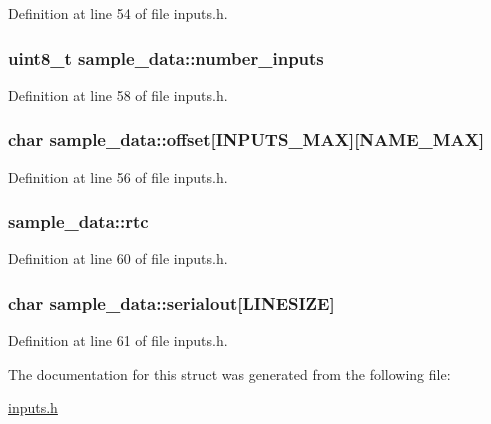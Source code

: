 Definition at line 54 of file inputs.\-h.

\hypertarget{structsample__data_aab5f5b842f431253c223d01ba22fef55}{
\subsubsection[{number\-\_\-inputs}]{\setlength{\rightskip}{0pt plus 5cm}uint8\-\_\-t sample\-\_\-data\-::number\-\_\-inputs}}\label{structsample__data_aab5f5b842f431253c223d01ba22fef55}


Definition at line 58 of file inputs.\-h.

\hypertarget{structsample__data_a4c30d8a850f9c106f5614849386d498e}{
\subsubsection[{offset}]{\setlength{\rightskip}{0pt plus 5cm}char sample\-\_\-data\-::offset\mbox{[}{\bf I\-N\-P\-U\-T\-S\-\_\-\-M\-A\-X}\mbox{]}\mbox{[}{\bf N\-A\-M\-E\-\_\-\-M\-A\-X}\mbox{]}}}\label{structsample__data_a4c30d8a850f9c106f5614849386d498e}


Definition at line 56 of file inputs.\-h.

\hypertarget{structsample__data_abc7bac4a5c01e9effcf9f33a42f57f06}{
\subsubsection[{rtc}]{ sample\-\_\-data\-::rtc}}\label{structsample__data_abc7bac4a5c01e9effcf9f33a42f57f06}


Definition at line 60 of file inputs.\-h.

\hypertarget{structsample__data_af18460f06968c075db59516a21c409a7}{
\subsubsection[{serialout}]{\setlength{\rightskip}{0pt plus 5cm}char sample\-\_\-data\-::serialout\mbox{[}{\bf L\-I\-N\-E\-S\-I\-Z\-E}\mbox{]}}}\label{structsample__data_af18460f06968c075db59516a21c409a7}


Definition at line 61 of file inputs.\-h.



The documentation for this struct was generated from the following file\-:\begin{DoxyCompactItemize}
\item 
\hyperlink{inputs_8h}{inputs.\-h}\end{DoxyCompactItemize}
